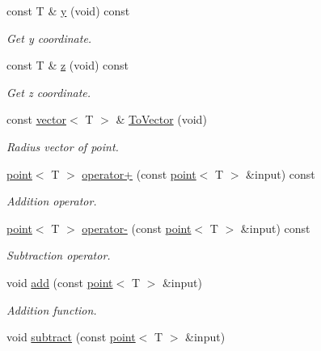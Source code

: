 \begin{DoxyCompactItemize}
const T \& \hyperlink{classddd_1_1point_a632f731dfcc4cc1693948d861cb7327d}{y} (void) const
\begin{DoxyCompactList}\small\item\em Get y coordinate. \end{DoxyCompactList}\item 
\mbox{\label{classddd_1_1point_aeb266a3811a70700ee7d52cacfdc0b9f}} 
const T \& \hyperlink{classddd_1_1point_aeb266a3811a70700ee7d52cacfdc0b9f}{z} (void) const
\begin{DoxyCompactList}\small\item\em Get z coordinate. \end{DoxyCompactList}\item 
\mbox{\label{classddd_1_1point_a3d8e57af2dfe4b200dc2b7ca63ff554a}} 
const \hyperlink{classddd_1_1vector}{vector}$<$ T $>$ \& \hyperlink{classddd_1_1point_a3d8e57af2dfe4b200dc2b7ca63ff554a}{To\+Vector} (void)
\begin{DoxyCompactList}\small\item\em Radius vector of point. \end{DoxyCompactList}\item 
\hyperlink{classddd_1_1point}{point}$<$ T $>$ \hyperlink{classddd_1_1point_ab0b0c990b117bb889d34d44509b645be}{operator+} (const \hyperlink{classddd_1_1point}{point}$<$ T $>$ \&input) const
\begin{DoxyCompactList}\small\item\em Addition operator. \end{DoxyCompactList}\item 
\hyperlink{classddd_1_1point}{point}$<$ T $>$ \hyperlink{classddd_1_1point_a5621f5a883c88d5588e09f9ff0de6575}{operator-\/} (const \hyperlink{classddd_1_1point}{point}$<$ T $>$ \&input) const
\begin{DoxyCompactList}\small\item\em Subtraction operator. \end{DoxyCompactList}\item 
void \hyperlink{classddd_1_1point_a66ad14a1d50eb4170c874f75b77e8b0b}{add} (const \hyperlink{classddd_1_1point}{point}$<$ T $>$ \&input)
\begin{DoxyCompactList}\small\item\em Addition function. \end{DoxyCompactList}\item 
void \hyperlink{classddd_1_1point_abf2e2ea5474534eb17d1cb6bd96b7913}{subtract} (const \hyperlink{classddd_1_1point}{point}$<$ T $>$ \&input)

\end{DoxyCompactItemize}
